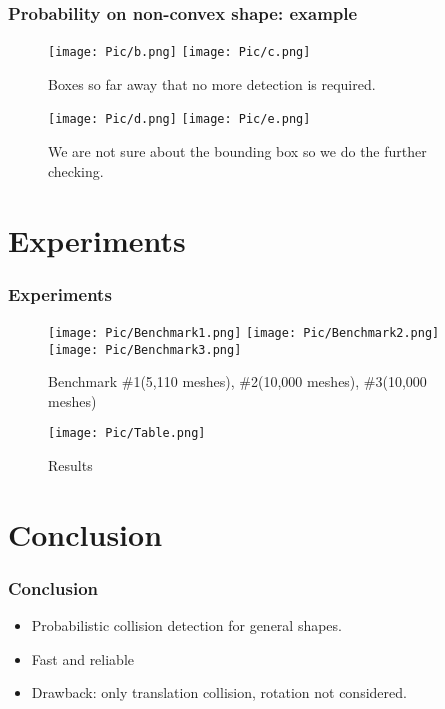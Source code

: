 \documentclass{beamer}
\begin{document}
\begin{frame}
\frametitle{Probability on non-convex shape: example}
	\begin{figure}	
		\texttt{[image: Pic/b.png]}
		\texttt{[image: Pic/c.png]}
		\caption{Boxes so far away that no more detection is required.}
	\end{figure}
	\begin{figure}	
		\texttt{[image: Pic/d.png]}
		\texttt{[image: Pic/e.png]}
		\caption{We are not sure about the bounding box so we do the further checking.}
	\end{figure}
\end{frame}

\section{Experiments}
\begin{frame}
\frametitle{Experiments}
	\begin{figure}	
		\texttt{[image: Pic/Benchmark1.png]}
		\texttt{[image: Pic/Benchmark2.png]}
		\texttt{[image: Pic/Benchmark3.png]}
		\caption{Benchmark \#1(5,110 meshes), \#2(10,000 meshes), \#3(10,000 meshes)}
	\end{figure}
	\begin{figure}	
		\texttt{[image: Pic/Table.png]}
		\caption{Results}
	\end{figure}
\end{frame}



\section{Conclusion}

\begin{frame}
\frametitle{Conclusion}
	\begin{itemize}
	\item Probabilistic collision detection for general shapes.
	\item Fast and reliable
	\item Drawback: only translation collision, rotation not considered.
	\end{itemize}
\end{frame}

\end{document}
